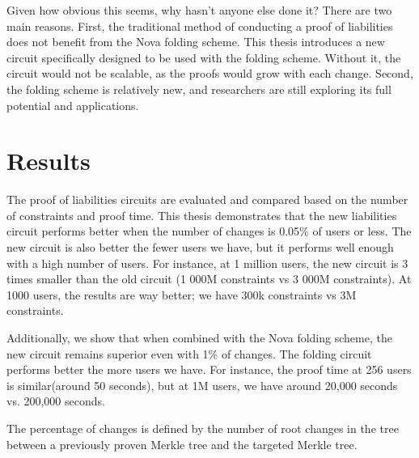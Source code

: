 Given how obvious this seems, why hasn't anyone else done it? 
There are two main reasons. First, the traditional method of conducting a proof of liabilities does not benefit from the 
Nova folding scheme. This thesis introduces a new circuit specifically designed to be used with the folding scheme. 
Without it, the circuit would not be scalable, as the proofs would grow with each change. 
Second, the folding scheme is relatively new, and researchers are still exploring its full potential and applications.


\section{Results}
The proof of liabilities circuits are evaluated and compared based on the number of constraints and proof time. 
This thesis demonstrates that the new liabilities circuit performs better when the number of changes is 0.05\% of users or less.
The new circuit is also better the fewer users we have, but it performs well enough with a high number of users. For instance, at 1 million users, 
the new circuit is 3 times smaller than the old circuit (1 000M constraints vs 3 000M constraints).
At 1000 users, the results are way better; we have 300k constraints vs 3M constraints. 

Additionally, we show that when combined with the Nova folding scheme, the new circuit remains superior even with 1\% of changes. 
The folding circuit performs better the more users we have.
For instance, the proof time at 256 users is similar(around 50 seconds), but at 1M users, we have around 20,000 seconds vs. 200,000 seconds. 

The percentage of changes is defined by the number of root changes in the tree between a previously proven Merkle tree and the targeted Merkle tree.
